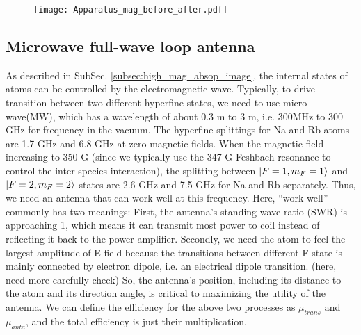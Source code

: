\begin{figure}[htbp]
\begin{center}
\texttt{[image: Apparatus\_mag\_before\_after.pdf]}
\end{center}
\caption[]{}
\label{Apparatus_mag_before_after}
\end{figure}

\subsection{Microwave full-wave loop antenna}
\label{subsec:FWLA}

As described in SubSec. \ref{subsec:high_mag_absop_image}, the internal states of atoms can be controlled by the electromagnetic wave. Typically, to drive transition between two different hyperfine states, we need to use micro-wave(MW), which has a wavelength of about 0.3 m to 3 m, i.e. 300MHz to 300 GHz for frequency in the vacuum. The hyperfine splittings for Na and Rb atoms are 1.7 GHz and 6.8 GHz at zero magnetic fields. When the magnetic field increasing to 350 G (since we typically use the 347 G Feshbach resonance to control the inter-species interaction), the splitting between $\ket{F=1,m_F=1}$ and $\ket{F=2, m_F=2}$ states are 2.6 GHz and 7.5 GHz for Na and Rb separately. Thus, we need an antenna that can work well at this frequency. Here, ``work well'' commonly has two meanings: First, the antenna's standing wave ratio (SWR) is approaching 1, which means it can transmit most power to coil instead of reflecting it back to the power amplifier. Secondly, we need the atom to feel the largest amplitude of E-field because the transitions between different F-state is mainly connected by electron dipole, i.e. an electrical dipole transition. (here, need more carefully check) So, the antenna's position, including its distance to the atom and its direction angle, is critical to maximizing the utility of the antenna. We can define the efficiency for the above two processes as $\mu_{trans}$ and $\mu_{anta}$, and the total efficiency is just their multiplication.

